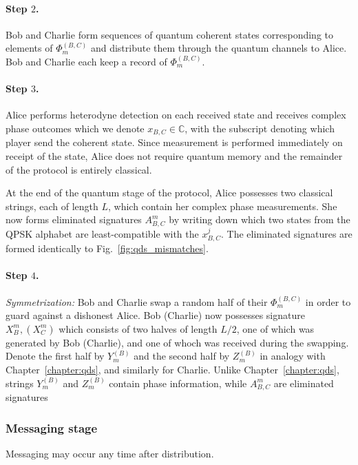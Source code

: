 \paragraph{Step $2$.} Bob and Charlie form sequences of quantum coherent states corresponding to elements of $\Phi_m^{\left(B, C\right)}$ and distribute them through the quantum channels to Alice. Bob and Charlie each keep a record of $\Phi_m^{\left(B, C\right)}$.

\paragraph{Step $3$.} Alice performs heterodyne detection on each received state and receives complex phase outcomes which we denote $x_{B, C} \in \mathbb{C}$, with the subscript denoting which player send the coherent state. Since measurement is performed immediately on receipt of the state, Alice does not require quantum memory and the remainder of the protocol is entirely classical.

At the end of the quantum stage of the protocol, Alice possesses two classical strings, each of length $L$, which contain her complex phase measurements. She now forms eliminated signatures $A_{B, C}^m$ by writing down which two states from the QPSK alphabet are least-compatible with the $x_{B, C}^j$. The eliminated signatures are formed identically to Fig.~\ref{fig:qds_mismatches}.

\paragraph{Step $4$.} \emph{Symmetrization:} Bob and Charlie swap a random half of their $\Phi_m^{\left(B, C\right)}$ in order to guard against a dishonest Alice. Bob (Charlie) now possesses signature $X_B^m, \left(X_C^m\right)$ which consists of two halves of length $L/2$, one of which was generated by Bob (Charlie), and one of whoch was received during the swapping. Denote the first half by $Y_m^{\left(B\right)}$ and the second half by $Z_m^{\left(B\right)}$ in analogy with Chapter~\ref{chapter:qds}, and similarly for Charlie. Unlike Chapter~\ref{chapter:qds}, strings $Y_m^{\left(B\right)}$ and $Z_m^{\left(B\right)}$ contain phase information, while $A_{B, C}^m$ are eliminated signatures

\subsubsection{Messaging stage}
Messaging may occur any time after distribution.

